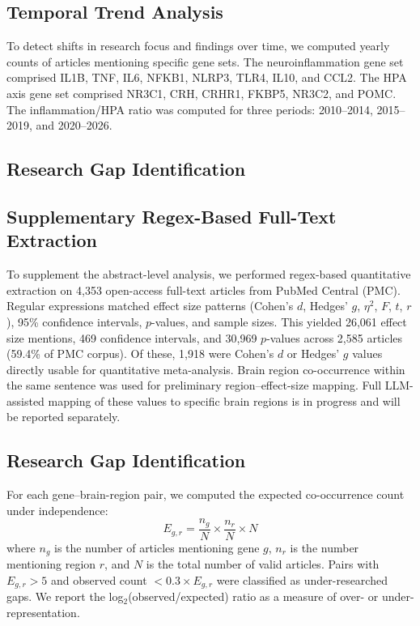 \documentclass[12pt,a4paper]{article}
\begin{document}
\subsection{Temporal Trend Analysis}

To detect shifts in research focus and findings over time, we computed yearly counts of articles mentioning specific gene sets. The neuroinflammation gene set comprised IL1B, TNF, IL6, NFKB1, NLRP3, TLR4, IL10, and CCL2. The HPA axis gene set comprised NR3C1, CRH, CRHR1, FKBP5, NR3C2, and POMC. The inflammation/HPA ratio was computed for three periods: 2010--2014, 2015--2019, and 2020--2026.

\subsection{Research Gap Identification}

\subsection{Supplementary Regex-Based Full-Text Extraction}

To supplement the abstract-level analysis, we performed regex-based quantitative extraction on 4,353 open-access full-text articles from PubMed Central (PMC). Regular expressions matched effect size patterns (Cohen's $d$, Hedges' $g$, $\eta^2$, $F$, $t$, $r$), 95\% confidence intervals, $p$-values, and sample sizes. This yielded 26,061 effect size mentions, 469 confidence intervals, and 30,969 $p$-values across 2,585 articles (59.4\% of PMC corpus). Of these, 1,918 were Cohen's $d$ or Hedges' $g$ values directly usable for quantitative meta-analysis. Brain region co-occurrence within the same sentence was used for preliminary region--effect-size mapping. Full LLM-assisted mapping of these values to specific brain regions is in progress and will be reported separately.

\subsection{Research Gap Identification}

For each gene--brain-region pair, we computed the expected co-occurrence count under independence:
\begin{equation}
E_{g,r} = \frac{n_g}{N} \times \frac{n_r}{N} \times N
\end{equation}
where $n_g$ is the number of articles mentioning gene $g$, $n_r$ is the number mentioning region $r$, and $N$ is the total number of valid articles. Pairs with $E_{g,r} > 5$ and observed count $< 0.3 \times E_{g,r}$ were classified as under-researched gaps. We report the log$_2$(observed/expected) ratio as a measure of over- or under-representation.
\end{document}
